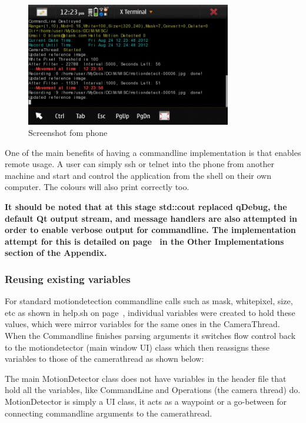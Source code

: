 {\begin{figure}[H]
	\vspace{-10pt}
	\begin{center}
		\includegraphics[width=0.8\textwidth]{../images/commandline/commandscreen.jpg}
	\end{center}
	\vspace{-20pt}
	\caption{Screenshot fom phone}
	\label{img:command}
	\vspace{-10pt}
\end{figure}

One of the main benefits of having a commandline implementation is that enables remote usage. A user can simply ssh or telnet into the phone from another machine and start and control the application from the shell on their own computer. The colours will also print correctly too.

{\small\bf It should be noted that at this stage std::cout replaced qDebug, the default Qt output stream, and message handlers are also attempted in order to enable verbose output for commandline. The implementation attempt for this is detailed on page~\pageref{qdebug} in the Other Implementations section of the Appendix.}

}
\subsubsection{Reusing existing variables}

For standard motiondetection commandline calls such as mask, whitepixel, size, etc as shown in help.sh on page~\pageref{frame:help}, individual variables were created to hold these values, which were mirror variables for the same ones in the CameraThread. When the Commandline finishes parsing arguments it switches flow control back to the motiondetector (main window UI) class which then reassigns these variables to those of the camerathread as shown below:
\begin{frame}[fragile]

\end{frame}
The main MotionDetector class does not have variables in the header file that hold all the variables, like CommandLine and Operations (the camera thread) do. MotionDetector is simply a UI class, it acts as a waypoint or a go-between for connecting commandline arguments to the camerathread.

